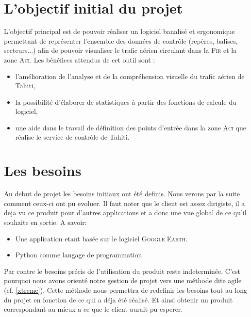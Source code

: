  
\section{L'objectif initial du projet}
L’objectif principal est de pouvoir réaliser un logiciel banalisé et ergonomique permettant de
représenter l’ensemble des données de contrôle (repères, balises, secteurs...) afin de pouvoir
visualiser le trafic aérien circulant dans la \textsc{Fir} et la zone \textsc{Aci}.
Les bénéfices attendus de cet outil sont :
\begin{itemize}
\item l’amélioration de l’analyse et de la compréhension visuelle du trafic aérien de Tahiti,
\item la possibilité d’élaborer de statistiques à partir des fonctions de calcule du logiciel,
\item une aide dans le travail de définition des points d’entrée dans la zone \textsc{Aci} que réalise le
service de contrôle de Tahiti.
\end{itemize}

\section{Les besoins}
Au debut de projet les besoins initiaux ont été definis. Nous verons par la suite comment ceux-ci ont pu evoluer. Il faut noter que le client est assez dirigiste, il a deja vu ce produit pour d'autres applications et a donc une vue global de ce qu'il souhaite en sortie. A savoir:
\begin{itemize}
    \item Une application etant basée sur le logiciel \textsc{Google Earth}.
    \item Python comme langage de programmation
\end{itemize}
Par contre le besoins précis de l'utilisation du produit reste indeterminée. C'est pourquoi nous avons orienté notre gestion de projet vers une méthode dite agile (cf. \vref{xtreme}). Cette méthode nous permettra de redefinir les besoins tout au long du projet en fonction de ce qui a déja été réalisé. Et ainsi obtenir un produit correspondant au mieux a ce que le client aurait pu esperer.

